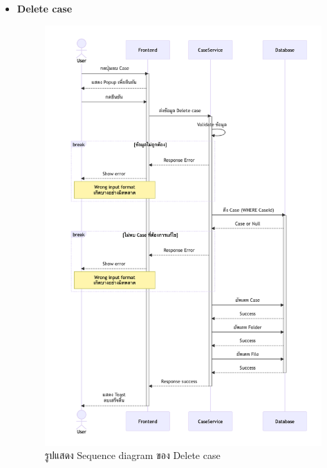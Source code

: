 \documentclass[12pt,oneside,openright,a4paper]{cpe-thai-project}
\begin{document}
\begin{itemize}
    \newpage
    \item \textbf{Delete case} \\
    \begin{figure}[!ht]\centering
        \includegraphics[width=13cm, trim={0 1cm 0 1cm},clip]{./assets/sequence-diagram/delete-case.png}
        \caption{รูปแสดง Sequence diagram ของ Delete case}\label{fig:sqDeleteCase}
    \end{figure}


\end{itemize}
\end{document}
